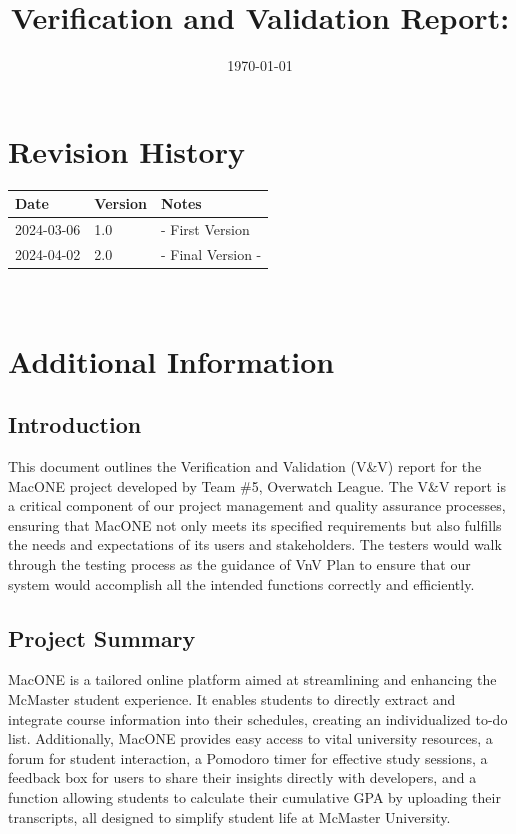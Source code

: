 \documentclass[12pt, titlepage]{article}
\begin{document}
\title{Verification and Validation Report: \progname} 
\author{\authname}
\date{\today}
	
\maketitle


\newpage

\tableofcontents

\listoftables %

\listoffigures %

\newpage


\section{Revision History}

\begin{tabularx}{\textwidth}{p{3cm}p{2cm}X}
\toprule {\bf Date} & {\bf Version} & {\bf Notes}\\
\midrule
2024-03-06 & 1.0 & - First Version\\
2024-04-02 & 2.0 & - Final Version -\\
\bottomrule
\end{tabularx}

~\newpage

\section{Additional Information}

\subsection{Introduction}
This document outlines the Verification and Validation (V\&V) report for the MacONE project developed by Team \#5, Overwatch League. The V\&V report is a critical component of our project management and quality assurance processes, ensuring that MacONE not only meets its specified requirements but also fulfills the needs and expectations of its users and stakeholders. The testers would walk through the testing process as the guidance of VnV Plan to ensure that our system would accomplish all the intended functions correctly and efficiently.  

\subsection{Project Summary}
MacONE is a tailored online platform aimed at streamlining and enhancing
the McMaster student experience. It enables students to directly extract and
integrate course information into their schedules, creating an individualized
to-do list. Additionally, MacONE provides easy access to vital university
resources, a forum for student interaction, a Pomodoro timer for effective
study sessions, a feedback box for users to share their insights directly with
developers, and a function allowing students to calculate their cumulative
GPA by uploading their transcripts, all designed to simplify student life at
McMaster University.
\end{document}
